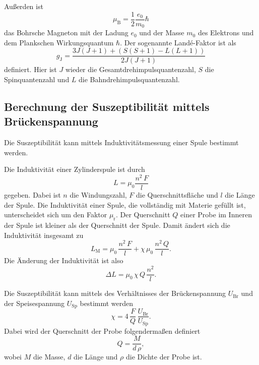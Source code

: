 \noindent Außerden ist
\begin{equation*}
    \mu_\text{B} = \frac{1}{2} \frac{e_0}{m_0} \hbar 
\end{equation*}
das Bohrsche Magneton mit der Ladung $e_0$ und der Masse $m_0$ des Elektrons und dem Plankschen 
Wirkungsquantum $\hbar$. Der sogenannte Landé-Faktor ist als 
\begin{equation*}
    g_\text{J}= \frac{3 J(J+1) + (S(S+1) - L(L+1))}{2J(J+1)}
\end{equation*}
definiert. Hier ist $J$ wieder die Gesamtdrehimpulsquantenzahl, $S$ die Spinquantenzahl und $L$ 
die Bahndrehimpulsquantenzahl.


\subsection{Berechnung der Suszeptibilität mittels Brückenspannung}
Die Suszeptibilität kann mittels Induktivitätsmessung einer Spule
bestimmt werden.

\noindent Die Induktivität einer Zylinderspule ist durch
\begin{equation*}
    L = \mu_0 \frac{n^2 \, F}{l}
\end{equation*}
gegeben.
Dabei ist $n$ die Windungszahl, $F$ die Querschnittsfläche und $l$ die Länge der Spule.
Die Induktivität einer Spule, die vollständig mit Materie gefüllt ist,
unterscheidet sich um den Faktor $\mu_\text{r}$.
Der Querschnitt $Q$ einer Probe im Inneren der Spule ist kleiner als der Querschnitt 
der Spule.
Damit ändert sich die Induktivität insgesamt zu 
\begin{equation*}
    L_\text{M}= \mu_0 \, \frac{n^2 \, F}{l} + \chi \, \mu_0 \, \frac{n^2 \, Q}{l}.
    \label{eqn:induktivität}
\end{equation*}
Die Änderung der Induktivität ist also %
\begin{equation*}
    \Delta L = \mu_0 \, \chi \, Q \, \frac{n^2}{l}.
\end{equation*}

\noindent Die Suszeptibilität kann mittels des Verhältnisses der Brückenspannung $U_\text{Br}$
und der Speisespannung $U_\text{Sp}$ bestimmt werden
\begin{equation}
    \chi = 4 \, \frac{F}{Q} \, \frac{U_\text{Br}}{U_\text{Sp}}.
    \label{eqn:chiexp1}
\end{equation}
Dabei wird der Querschnitt der Probe folgendermaßen definiert
\begin{equation*}
    Q = \frac{M}{d \, \rho},
\end{equation*}
wobei $M$ die Masse, $d$ die Länge und $\rho$ die Dichte der Probe ist.



